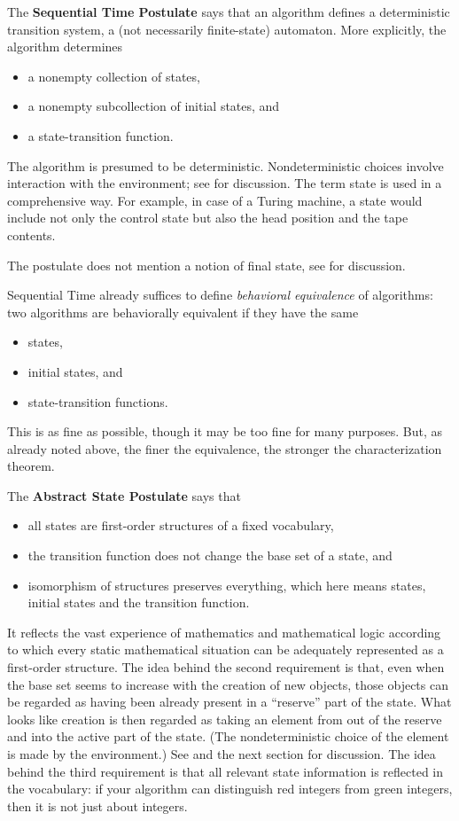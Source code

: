 \documentclass{LMCS}
\theoremstyle{definition}
\begin{document}
The \textbf{Sequential Time Postulate} says that an algorithm defines a
deterministic transition system, a (not necessarily finite-state)
automaton.  More explicitly, the algorithm determines
\begin{itemize}
\item a nonempty collection of states,
\item a nonempty subcollection of initial states, and
\item a state-transition function.
\end{itemize}
The algorithm is presumed to be deterministic.  Nondeterministic choices
involve interaction with the environment; see \cite{lipari,seqth,oa1} for
discussion.  The term state is used  in a comprehensive way.  For
example, in case of a Turing machine, a state would include not only
the control state but also the head
position and the tape contents.

The postulate does not mention a notion of final state, see \cite{seqth}
for discussion.


Sequential Time already suffices to define \emph{behavioral
equivalence} of algorithms: two algorithms are behaviorally
equivalent if they have the same
\begin{itemize}
\item states,
\item initial states, and
\item state-transition functions.
\end{itemize}
This is as fine as possible, though it may be too fine for many purposes.
But, as already noted above, the finer the equivalence, the stronger the
characterization theorem.

The \textbf{Abstract State Postulate} says that
\begin{itemize}
\item
all states are first-order structures of a fixed vocabulary,
\item the transition function does not change the base set of a
state, and
\item isomorphism of structures preserves everything, which here
means states, initial states and the transition function.
\end{itemize}
It reflects the vast experience of mathematics and mathematical logic
according to which every static mathematical situation can be adequately
represented as a first-order structure.  The idea behind the second
requirement is that, even when the base set seems to increase with the
creation of new objects, those objects can be regarded as having been
already present in a ``reserve'' part of the state.  What looks like
creation is then regarded as taking an element from out of the reserve and
into the active part of the state.  (The nondeterministic choice of the
element is made by the environment.)  See \cite{lipari,seqth,oa1,oa2} and
the next section for discussion.  The idea behind the third requirement is
that all relevant state information is reflected in the vocabulary: if
your algorithm can distinguish red integers from green integers, then it
is not just about integers.
\end{document}

